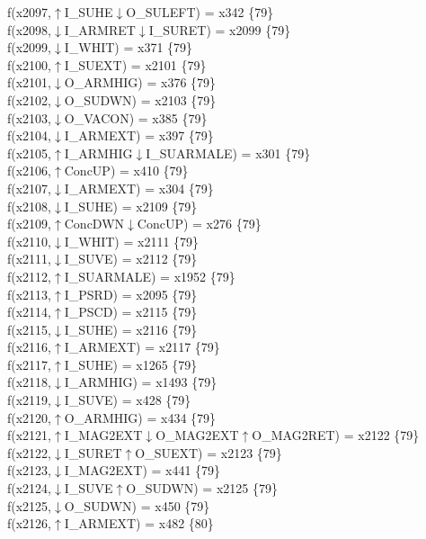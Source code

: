 f(x2097,$\uparrow$I\_SUHE$\downarrow$O\_SULEFT) = x342 \{79\} \\  
f(x2098,$\downarrow$I\_ARMRET$\downarrow$I\_SURET) = x2099 \{79\} \\  
f(x2099,$\downarrow$I\_WHIT) = x371 \{79\} \\  
f(x2100,$\uparrow$I\_SUEXT) = x2101 \{79\} \\  
f(x2101,$\downarrow$O\_ARMHIG) = x376 \{79\} \\  
f(x2102,$\downarrow$O\_SUDWN) = x2103 \{79\} \\  
f(x2103,$\downarrow$O\_VACON) = x385 \{79\} \\  
f(x2104,$\downarrow$I\_ARMEXT) = x397 \{79\} \\  
f(x2105,$\uparrow$I\_ARMHIG$\downarrow$I\_SUARMALE) = x301 \{79\} \\  
f(x2106,$\uparrow$ConcUP) = x410 \{79\} \\  
f(x2107,$\downarrow$I\_ARMEXT) = x304 \{79\} \\  
f(x2108,$\downarrow$I\_SUHE) = x2109 \{79\} \\  
f(x2109,$\uparrow$ConcDWN$\downarrow$ConcUP) = x276 \{79\} \\  
f(x2110,$\downarrow$I\_WHIT) = x2111 \{79\} \\  
f(x2111,$\downarrow$I\_SUVE) = x2112 \{79\} \\  
f(x2112,$\uparrow$I\_SUARMALE) = x1952 \{79\} \\  
f(x2113,$\uparrow$I\_PSRD) = x2095 \{79\} \\  
f(x2114,$\uparrow$I\_PSCD) = x2115 \{79\} \\  
f(x2115,$\downarrow$I\_SUHE) = x2116 \{79\} \\  
f(x2116,$\uparrow$I\_ARMEXT) = x2117 \{79\} \\  
f(x2117,$\uparrow$I\_SUHE) = x1265 \{79\} \\  
f(x2118,$\downarrow$I\_ARMHIG) = x1493 \{79\} \\  
f(x2119,$\downarrow$I\_SUVE) = x428 \{79\} \\  
f(x2120,$\uparrow$O\_ARMHIG) = x434 \{79\} \\  
f(x2121,$\uparrow$I\_MAG2EXT$\downarrow$O\_MAG2EXT$\uparrow$O\_MAG2RET) = x2122 \{79\} \\  
f(x2122,$\downarrow$I\_SURET$\uparrow$O\_SUEXT) = x2123 \{79\} \\  
f(x2123,$\downarrow$I\_MAG2EXT) = x441 \{79\} \\  
f(x2124,$\downarrow$I\_SUVE$\uparrow$O\_SUDWN) = x2125 \{79\} \\  
f(x2125,$\downarrow$O\_SUDWN) = x450 \{79\} \\  
f(x2126,$\uparrow$I\_ARMEXT) = x482 \{80\} \\  
